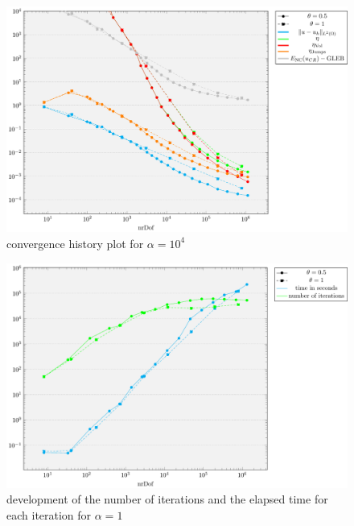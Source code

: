 \documentclass[draft=false,twoside,12pt]{scrreprt}
\begin{document}
\vspace{-\parskip}
\begin{figure}[H]
	\centering
	\includegraphics[width=16.5cm]{tikzPlots/f01/alpha1e4/convergence.pdf}
  \caption{convergence history plot for $\alpha=10^4$}
\end{figure}

\vspace{-\parskip}
\begin{figure}[H]
	\centering
	\includegraphics[width=16cm]{tikzPlots/f01/alpha1/misc.pdf}
  \caption{development of the number of iterations and the elapsed time for 
  each iteration for $\alpha=1$}
\end{figure}
\end{document}
